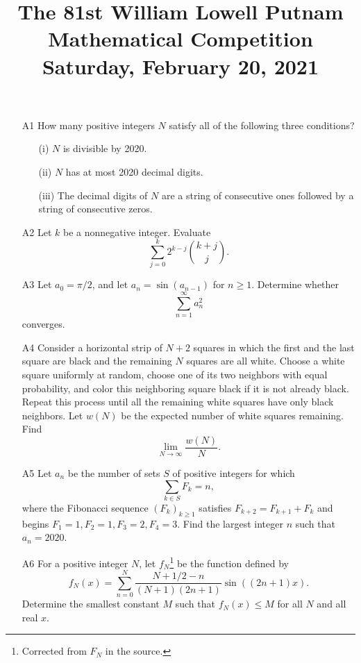 \documentclass[amssymb,twocolumn,pra,10pt,aps,nofootinbib]{revtex4-1}
\begin{document}
\title{The 81st William Lowell Putnam Mathematical Competition \\
    Saturday, February 20, 2021}
\maketitle

\begin{itemize}

\item[A1]
How many positive integers $N$ satisfy all of the following three conditions?
\begin{enumerate}
\item[(i)] $N$ is divisible by 2020.
\item[(ii)] $N$ has at most 2020 decimal digits.
\item[(iii)] The decimal digits of $N$ are a string of consecutive ones followed by a string of consecutive zeros.
\end{enumerate}

\item[A2]
Let $k$ be a nonnegative integer. Evaluate
\[
\sum_{j=0}^k 2^{k-j} \binom{k+j}{j}.
\]

\item[A3]
Let $a_0 = \pi/2$, and let $a_n = \sin(a_{n-1})$ for $n \geq 1$. Determine whether
\[
\sum_{n=1}^\infty a_n^2
\]
converges.

\item[A4]
Consider a horizontal strip of $N+2$ squares in which the first and the last square are black and the remaining $N$ squares are all white. Choose a white square uniformly at random, choose one of its two neighbors with equal probability,
and color this neighboring square black if it is not already black. Repeat this process until all the remaining white squares have only black neighbors. Let $w(N)$ be the expected number of white squares remaining. Find
\[
\lim_{N \to \infty} \frac{w(N)}{N}.
\]
 
\item[A5]
Let $a_n$ be the number of sets $S$ of positive integers for which
\[
\sum_{k \in S} F_k = n,
\]
where the Fibonacci sequence $(F_k)_{k \geq 1}$ satisfies $F_{k+2} = F_{k+1} + F_k$ and begins $F_1 = 1, F_2 = 1, F_3 = 2, F_4 = 3$. Find the largest integer $n$ such that $a_n = 2020$.

\item[A6] 
For a positive integer $N$, let $f_N$\footnote{Corrected from $F_N$ in the source.} be the function defined by 
\[
f_N(x) = \sum_{n=0}^N \frac{N+1/2-n}{(N+1)(2n+1)} \sin((2n+1)x).
\]
Determine the smallest constant $M$ such that $f_N(x) \leq M$ for all $N$ and all real $x$.


\end{itemize}
\end{document}
